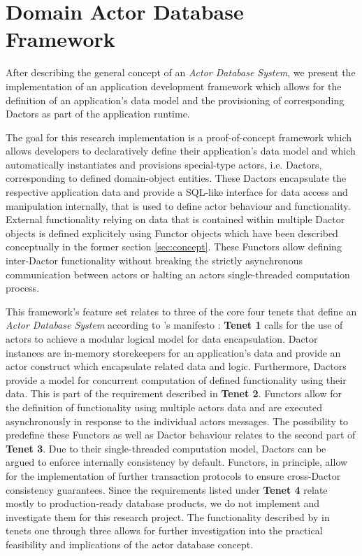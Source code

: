
\section{Domain Actor Database Framework}\label{sec:framework}

After describing the general concept of an \textit{Actor Database System}, we present the implementation of an application development framework which allows for the definition of an application's data model and the provisioning of corresponding Dactors as part of the application runtime.

The goal for this research implementation is a proof-of-concept framework which allows developers to declaratively define their application's data model
and which automatically instantiates and provisions special-type actors, i.e. Dactors, corresponding to defined domain-object entities.
These Dactors encapsulate the respective application data and provide a SQL-like interface for data access and manipulation internally, that is used to define actor behaviour and functionality.
External functionality relying on data that is contained within multiple Dactor objects is defined explicitely using Functor objects which have been described conceptually in the former section \ref{sec:concept}.
These Functors allow defining inter-Dactor functionality without breaking the strictly asynchronous communication between actors or halting an actors single-threaded computation process.

This framework's feature set relates to three of the core four tenets that define an \textit{Actor Database System} according to \citeauthor{manifesto}'s manifesto \cite{manifesto}:
\textbf{Tenet 1} calls for the use of actors to achieve a modular logical model for data encapsulation.
Dactor instances are in-memory storekeepers for an application's data and provide an actor construct which encapsulate related data and logic.
Furthermore, Dactors provide a model for concurrent computation of defined functionality using their data.
This is part of the requirement described in \textbf{Tenet 2}.
Functors allow for the definition of functionality using multiple actors data and are executed asynchronously in response to the individual actors messages.
The possibility to predefine these Functors as well as Dactor behaviour relates to the second part of \textbf{Tenet 3}.
Due to their single-threaded computation model, Dactors can be argued to enforce internally consistency by default.
Functors, in principle, allow for the implementation of further transaction protocols to ensure cross-Dactor consistency guarantees.
Since the requirements listed under \textbf{Tenet 4} relate mostly to production-ready database products, we do not implement and investigate them for this research project.
The functionality described by \citeauthor{manifesto} in tenets one through three allows for further investigation into the practical feasibility and implications of the actor database concept.

